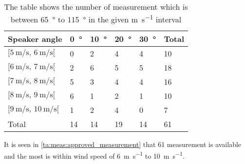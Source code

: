 \begin{table}[H]
\centering
\caption{The table shows the number of measurement which is between \SI{65}{\degree} to \SI{115}{\degree} in the given \si{\meter\per\second} interval}
\begin{tabular}{l|l|l|l|l|l}
Speaker angle & \SI{0}{\degree}  & \SI{10}{\degree} & \SI{20}{\degree} & \SI{30}{\degree} & Total \\ \hline
$[\SI{5}{\meter\per\second},\, \SI{6}{\meter\per\second}[ $         & 0  & 2  & 4  & 4  & 10    \\
$[\SI{6}{\meter\per\second},\, \SI{7}{\meter\per\second}[$           & 2  & 6  & 5  & 5  & 18    \\
$[\SI{7}{\meter\per\second},\, \SI{8}{\meter\per\second}[ $          & 5  & 3  & 4  & 4  & 16    \\
$[\SI{8}{\meter\per\second},\, \SI{9}{\meter\per\second}[ $          & 6  & 1  & 2  & 1  & 10    \\
$[\SI{9}{\meter\per\second},\, \SI{10}{\meter\per\second}[  $        & 1  & 2  & 4  & 0  & 7     \\ \hline
Total         & 14 & 14 & 19 & 14 &   61   
\end{tabular}
\label{ta:meas:approved_measurement}
\end{table}

It is seen in \autoref{ta:meas:approved_measurement} that 61 measurement is available and the most is within wind speed of \SI{6}{\meter\per\second} to \SI{10}{\meter\per\second}.

